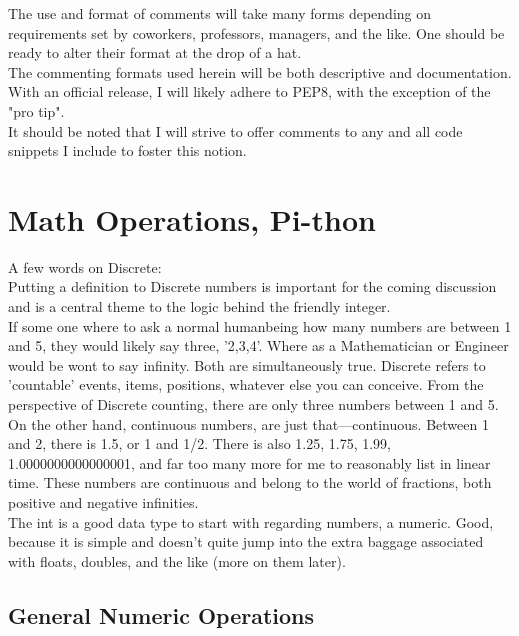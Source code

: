 \documentclass[oneside,12pt]{memoir} %
\begin{document}
The use and format of comments will take many forms depending on requirements set by coworkers, professors, managers, and the like. One should be ready to alter their format at the drop of a hat.\\

The commenting formats used herein will be both descriptive and documentation. With an official release, I will likely adhere to PEP8, with the exception of the "pro tip". \\

 It should be noted that I will strive to offer comments to any and all code snippets I include to foster this notion. \\

\section{Math Operations, Pi-thon}
\label{math_operations}

A few words on Discrete:\\
Putting a definition to Discrete numbers is important for the coming discussion and is a central theme to the logic behind the friendly integer. \\

If some one where to ask a normal humanbeing how many numbers are between 1 and 5, they would likely say three, '2,3,4'. Where as a Mathematician or Engineer would be wont to say infinity. Both are simultaneously true. Discrete refers to 'countable' events, items, positions, whatever else you can conceive. From the perspective of Discrete counting, there are only three numbers between 1 and 5. \\
On the other hand, continuous numbers, are just that––continuous. Between 1 and 2, there is 1.5, or 1 and 1/2. There is also 1.25, 1.75, 1.99, 1.0000000000000001, and far too many more for me to reasonably list in linear time. These numbers are continuous and belong to the world of fractions, both positive and negative infinities. \\

The int is a good data type to start with regarding numbers, a numeric. Good, because it is simple and doesn't quite jump into the extra baggage associated with floats, doubles, and the like (more on them later).\\


\subsection{General Numeric Operations}
\label{sub:general_numeric_operations}
\end{document}
